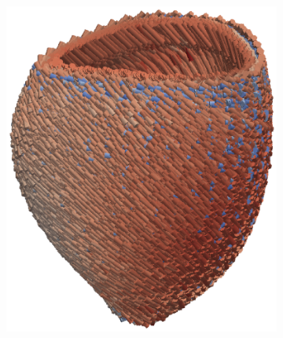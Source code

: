 \begin{figure}[htbp]
\begin{subfigure}[t]{0.25\textwidth}
    \caption{\label{paper1:fig:compgeo_mesh}}    
\end{subfigure}
\qquad
\begin{subfigure}[t]{0.25\textwidth}
    \includegraphics[width=\textwidth, trim={15cm 4cm 21cm 3cm}, clip]{fibers}
    \caption{\label{paper1:fig:compgeo_fibers}}
\end{subfigure}
\qquad
\begin{subfigure}[t]{0.25\textwidth}

\end{subfigure}
\end{figure}
